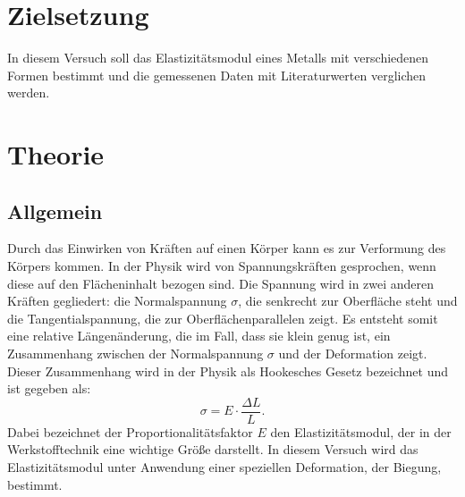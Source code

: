 \section{Zielsetzung}
\label{sec:Zielsetzung}

In diesem Versuch soll das Elastizitätsmodul eines Metalls mit verschiedenen Formen bestimmt und die gemessenen Daten mit Literaturwerten verglichen werden. 

\section{Theorie}
\label{sec:Theorie}

\subsection{Allgemein}
Durch das Einwirken von Kräften auf einen Körper kann es zur Verformung des Körpers kommen. In der Physik wird von Spannungskräften gesprochen, wenn diese auf den Flächeninhalt bezogen sind. Die Spannung wird in zwei anderen Kräften gegliedert: die Normalspannung $\sigma$, die senkrecht zur Oberfläche steht und die Tangentialspannung, die zur Oberflächenparallelen zeigt. Es entsteht somit eine relative Längenänderung, die im Fall, dass sie klein genug ist, ein Zusammenhang zwischen der Normalspannung $\sigma$ und der Deformation zeigt. Dieser Zusammenhang wird in der Physik als Hookesches Gesetz bezeichnet und ist gegeben als: 
\begin{equation}
\label{eqn: Hooke}
\sigma = E \cdot \frac{\Delta L}{L}.
\end{equation}
Dabei bezeichnet der Proportionalitätsfaktor $E$ den Elastizitätsmodul, der in der Werkstofftechnik eine wichtige Größe darstellt.
In diesem Versuch wird das Elastizitätsmodul unter Anwendung einer speziellen Deformation, der Biegung, bestimmt. 

